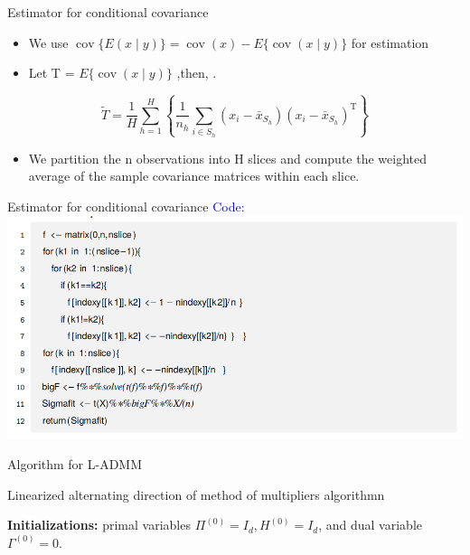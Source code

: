 \documentclass{beamer}
\begin{document}
\begin{frame}{Estimator for conditional covariance}
   \begin{itemize}
       \item We use $\operatorname{cov}\{E(x \mid y)\}=\operatorname{cov}(x)-E\{\operatorname{cov}(x \mid y)\}$ for estimation
       \item Let T = $E\{\operatorname{cov}(x \mid y)\}$ ,then, .
       \color{black}{We estimate T using following method:}
   \end{itemize}
    \begin{equation}
        \tilde{T}=\frac{1}{H} \sum_{h=1}^{H}\left\{\frac{1}{n_{h}} \sum_{i \in S_{h}}\left(x_{i}-\bar{x}_{S_{h}}\right)\left(x_{i}-\bar{x}_{S_{h}}\right)^{\mathrm{T}}\right\}
    \end{equation}
    \begin{itemize}
        \item We partition the n observations into H slices and compute the weighted average of the sample covariance matrices within each slice.
    \end{itemize}
\end{frame}

\begin{frame}{Estimator for conditional covariance}
  \textcolor{blue}{Code:}\\
  \centering \includegraphics[scale=0.3]{code1}
\end{frame}

\begin{frame}{Algorithm for L-ADMM}
  \begin{algorithm}[H]
\caption{Linearized alternating direction of method of multipliers algorithmn}


\textbf{Initializations:  }primal variables $\Pi^{(0)}=I_{d}, H^{(0)}=I_{d}$, and dual variable $\Gamma^{(0)}=0$.\;
\end{algorithm}
\end{frame}
\end{document}
